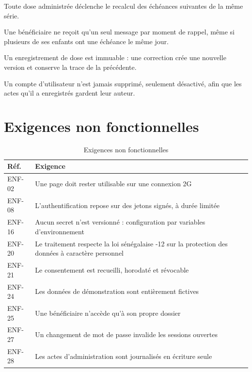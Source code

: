 \documentclass[11pt,a4paper]{report}
\begin{document}
\begin{description}[leftmargin=1.8cm, style=nextline]
  \item[RG-03] Toute dose administrée déclenche le recalcul des échéances
  suivantes de la même série.
  \item[RG-09] Une bénéficiaire ne reçoit qu'un seul message par moment de
  rappel, même si plusieurs de ses enfants ont une échéance le même jour.
  \item[RG-10] Un enregistrement de dose est immuable : une correction crée
  une nouvelle version et conserve la trace de la précédente.
  \item[RG-12] Un compte d'utilisateur n'est jamais supprimé, seulement
  désactivé, afin que les actes qu'il a enregistrés gardent leur auteur.
\end{description}

\section{Exigences non fonctionnelles}

\begin{table}[H]
\centering
\begin{tabularx}{\textwidth}{@{}lX@{}}
\toprule
\textbf{Réf.} & \textbf{Exigence} \\
\midrule
ENF-02 & Une page doit rester utilisable sur une connexion 2G \\
ENF-08 & L'authentification repose sur des jetons signés, à durée limitée \\
ENF-16 & Aucun secret n'est versionné : configuration par variables
d'environnement \\
ENF-20 & Le traitement respecte la loi sénégalaise \no 2008-12 sur la
protection des données à caractère personnel \\
ENF-21 & Le consentement est recueilli, horodaté et révocable \\
ENF-24 & Les données de démonstration sont entièrement fictives \\
ENF-25 & Une bénéficiaire n'accède qu'à son propre dossier \\
ENF-27 & Un changement de mot de passe invalide les sessions ouvertes \\
ENF-28 & Les actes d'administration sont journalisés en écriture seule \\
\bottomrule
\end{tabularx}
\caption{Exigences non fonctionnelles}
\end{table}
\end{document}
